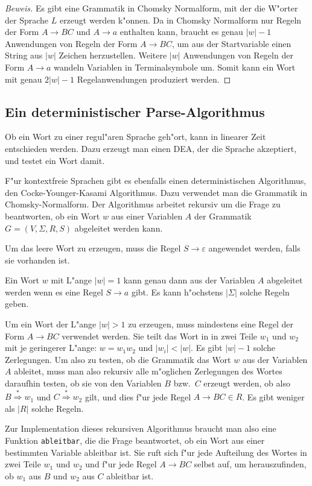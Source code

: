 \begin{proof}[Beweis]
Es gibt eine Grammatik in Chomsky Normalform, mit der die W"orter
der Sprache $L$ erzeugt werden k"onnen.
Da in Chomsky Normalform nur Regeln der Form $A\to BC$ und $A\to a$
enthalten kann, braucht es genau $|w|-1$ Anwendungen von Regeln der Form
$A\to BC$, um aus der Startvariable einen String aus $|w|$ Zeichen
herzustellen. Weitere $|w|$ Anwendungen von Regeln der Form $A\to a$
wandeln Variablen in Terminalsymbole um. Somit kann ein Wort mit
genau $2|w|-1$ Regelanwendungen produziert werden.
\end{proof}


\subsection{Ein deterministischer Parse-Algorithmus}
Ob ein Wort zu einer regul"aren Sprache geh"ort, kann in linearer
Zeit entschieden werden. Dazu erzeugt man einen DEA, der die Sprache
akzeptiert, und testet ein Wort damit.

F"ur kontextfreie Sprachen gibt es ebenfalls einen deterministischen
Algorithmus, den Cocke-Younger-Kasami Algorithmus. Dazu verwendet
man die Grammatik in Chomsky-Normalform. Der Algorithmus arbeitet
rekursiv um die Frage zu beantworten, ob ein Wort $w$ aus einer
Variablen $A$ der Grammatik $G=(V,\Sigma,R,S)$  abgeleitet
werden kann.

Um das leere Wort zu erzeugen, muss die Regel $S\to\varepsilon$
angewendet werden, falls sie vorhanden ist.

Ein Wort $w$ mit L"ange $|w|=1$ kann genau dann aus der Variablen 
$A$ abgeleitet werden wenn es eine Regel $S\to a$ gibt. 
Es kann h"ochstens $|\Sigma|$ solche Regeln geben.

Um ein Wort der L"ange $|w|>1$ zu erzeugen, muss mindestens eine
Regel der Form
$A\to BC$ verwendet werden. Sie teilt das Wort in in zwei Teile
$w_1$ und $w_2$ mit je geringerer L"ange: $w=w_1w_2$ und 
$|w_i|<|w|$. Es gibt $|w|-1$ solche Zerlegungen. Um also zu testen,
ob die Grammatik das Wort $w$ aus der Variablen $A$ ableitet,
muss man also rekursiv alle m"oglichen
Zerlegungen des Wortes daraufhin testen, ob sie von den Variablen
$B$ bzw.~$C$ erzeugt werden, ob also $B\overset{*}\Rightarrow w_1$
und $C\overset{*}\Rightarrow w_2$ gilt, und dies f"ur jede
Regel $A\to BC\in R$. Es gibt weniger als $|R|$ solche Regeln.

Zur Implementation dieses rekursiven Algorithmus braucht man
also eine Funktion {\tt ableitbar}, die die Frage beantwortet,
ob ein Wort aus einer bestimmten Variable ableitbar ist. Sie
ruft sich f"ur jede Aufteilung des Wortes in zwei Teile
$w_1$ und $w_2$ und f"ur jede Regel $A\to BC$ selbst auf, um
herauszufinden, ob $w_1$ aus $B$ und $w_2$ aus $C$ ableitbar ist.

